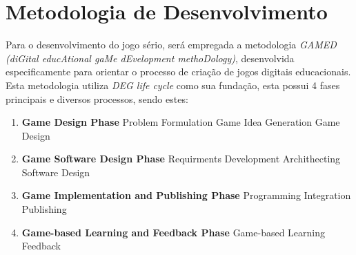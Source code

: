 \section{Metodologia de Desenvolvimento}

Para o desenvolvimento do jogo sério, será empregada a metodologia \emph{GAMED (diGital educAtional gaMe dEvelopment methoDology)}, desenvolvida especificamente para orientar o processo de criação de jogos digitais educacionais. Esta metodologia utiliza \emph{DEG life cycle} como sua fundação, esta possui 4 fases principais e diversos processos, sendo estes:

\begin{enumerate}
  \item \textbf{Game Design Phase}
    \subitem Problem Formulation
    \subitem Game Idea Generation
    \subitem Game Design
  \item \textbf{Game Software Design Phase}
    \subitem Requirments Development
    \subitem Archithecting
    \subitem Software Design
  \item \textbf{Game Implementation and Publishing Phase}
    \subitem Programming
    \subitem Integration
    \subitem Publishing
  \item \textbf{Game-based Learning and Feedback Phase}
    \subitem Game-based Learning
    \subitem Feedback
\end{enumerate}



